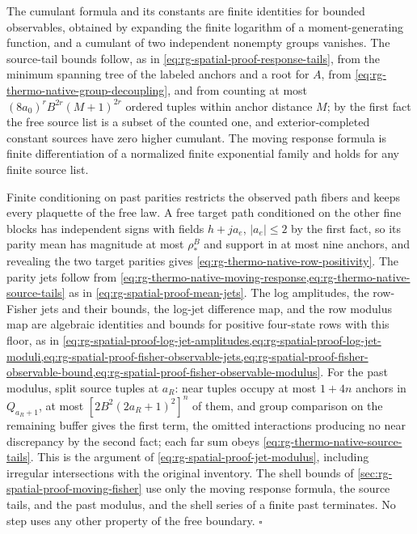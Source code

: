 The cumulant formula and its constants are finite identities for bounded
observables, obtained by expanding the finite logarithm of a
moment-generating function, and a cumulant of two independent nonempty
groups vanishes. The source-tail bounds follow, as in
\cref{eq:rg-spatial-proof-response-tails}, from the minimum spanning tree of
the labeled anchors and a root for $A$, from
\cref{eq:rg-thermo-native-group-decoupling}, and from counting at most
$(8a_0)^rB^{2r}(M+1)^{2r}$ ordered tuples within anchor distance $M$; by the
first fact the free source list is a subset of the counted one, and
exterior-completed constant sources have zero higher cumulant. The moving
response formula is finite differentiation of a normalized finite
exponential family and holds for any finite source list.

Finite conditioning on past parities restricts the observed path fibers and
keeps every plaquette of the free law. A free target path conditioned on the
other fine blocks has independent signs with fields $h+ja_e$, $|a_e|\le2$ by
the first fact, so its parity mean has magnitude at most $\rho_*^B$ and
support in at most nine anchors, and revealing the two target parities gives
\cref{eq:rg-thermo-native-row-positivity}. The parity jets follow from
\cref{eq:rg-thermo-native-moving-response,eq:rg-thermo-native-source-tails}
as in \cref{eq:rg-spatial-proof-mean-jets}. The log amplitudes, the
row-Fisher jets and their bounds, the log-jet difference map, and the row
modulus map are algebraic identities and bounds for positive four-state rows
with this floor, as in
\cref{eq:rg-spatial-proof-log-jet-amplitudes,eq:rg-spatial-proof-log-jet-moduli,eq:rg-spatial-proof-fisher-observable-jets,eq:rg-spatial-proof-fisher-observable-bound,eq:rg-spatial-proof-fisher-observable-modulus}.
For the past modulus, split source tuples at $a_R$: near tuples occupy at
most $1+4n$ anchors in $Q_{a_R+1}$, at most $[2B^2(2a_R+1)^2]^n$ of them, and
group comparison on the remaining buffer gives the first term, the omitted
interactions producing no near discrepancy by the second fact; each far sum
obeys \cref{eq:rg-thermo-native-source-tails}. This is the argument of
\cref{eq:rg-spatial-proof-jet-modulus}, including irregular intersections with
the original inventory. The shell bounds of
\cref{sec:rg-spatial-proof-moving-fisher} use only the moving response
formula, the source tails, and the past modulus, and the shell series of a
finite past terminates. No step uses any other property of the free
boundary. $\square$

